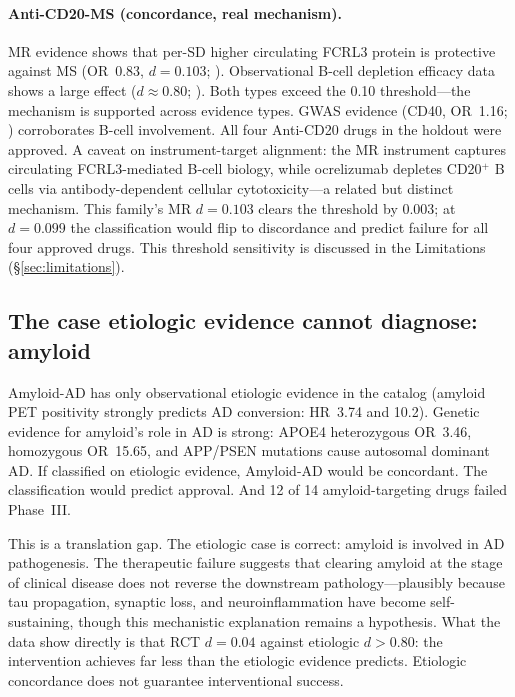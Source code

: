 \documentclass[11pt]{article}
\begin{document}
\paragraph{Anti-CD20-MS (concordance, real mechanism).} MR evidence shows that per-SD higher circulating FCRL3 protein is protective against MS (OR~0.83, $d = 0.103$; \citealp{lin2023}). Observational B-cell depletion efficacy data shows a large effect ($d \approx 0.80$; \citealp{hu2019}). Both types exceed the 0.10 threshold---the mechanism is supported across evidence types. GWAS evidence (CD40, OR~1.16; \citealp{sokolova2013}) corroborates B-cell involvement. All four Anti-CD20 drugs in the holdout were approved. A caveat on instrument-target alignment: the MR instrument captures circulating FCRL3-mediated B-cell biology, while ocrelizumab depletes CD20$^+$ B cells via antibody-dependent cellular cytotoxicity---a related but distinct mechanism. This family's MR $d = 0.103$ clears the threshold by 0.003; at $d = 0.099$ the classification would flip to discordance and predict failure for all four approved drugs. This threshold sensitivity is discussed in the Limitations (\S\ref{sec:limitations}).

\subsection{The case etiologic evidence cannot diagnose: amyloid}
\label{sec:amyloid}

Amyloid-AD has only observational etiologic evidence in the catalog (amyloid PET positivity strongly predicts AD conversion: HR~3.74 and 10.2). Genetic evidence for amyloid's role in AD is strong: APOE4 heterozygous OR~3.46, homozygous OR~15.65, and APP/PSEN mutations cause autosomal dominant AD. If classified on etiologic evidence, Amyloid-AD would be concordant. The classification would predict approval. And 12 of 14 amyloid-targeting drugs failed Phase~III.

This is a translation gap. The etiologic case is correct: amyloid is involved in AD pathogenesis. The therapeutic failure suggests that clearing amyloid at the stage of clinical disease does not reverse the downstream pathology---plausibly because tau propagation, synaptic loss, and neuroinflammation have become self-sustaining, though this mechanistic explanation remains a hypothesis. What the data show directly is that RCT $d = 0.04$ against etiologic $d > 0.80$: the intervention achieves far less than the etiologic evidence predicts. Etiologic concordance does not guarantee interventional success.
\end{document}
